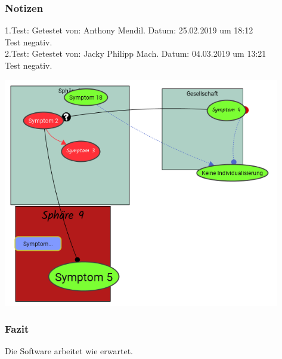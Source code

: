 \documentclass[enabledeprecatedfontcommands]{scrartcl}
\begin{document}
\subsubsection{Notizen}
1.Test: Getestet von: Anthony Mendil. Datum: 25.02.2019 um 18:12  \\
Test negativ. \\
2.Test: Getestet von: Jacky Philipp Mach. Datum: 04.03.2019 um 13:21 \\
Test negativ.
\begin{center}
\includegraphics[height=10cm]{3_57.PNG}
\end{center}
\subsubsection{Fazit}
Die Software arbeitet wie erwartet. \\
\end{document}
